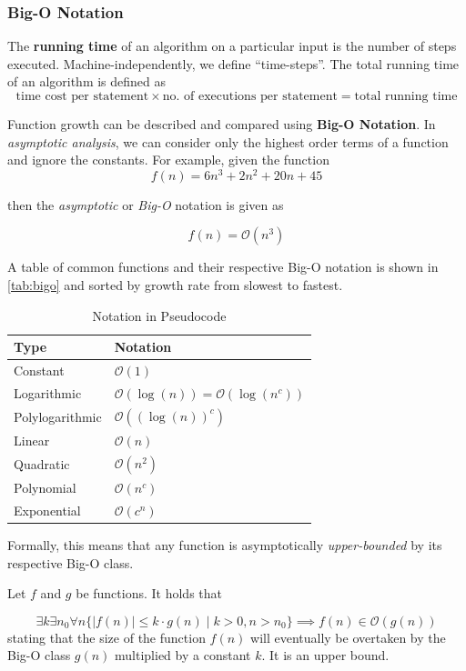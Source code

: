 \subsubsection{Big-O Notation}
The \textbf{running time} of an algorithm on a particular input is the number of steps executed. Machine-independently, we define ``time-steps''. The total running time of an algorithm is defined as
\[
	\textrm{time cost per statement} \times \textrm{no. of executions per statement} = \textrm{total running time}
\]

Function growth can be described and compared using \textbf{Big-O Notation}. In \emph{asymptotic analysis}, we can consider only the highest order terms of a function and ignore the constants. For example, given the function \[
f(n) = 6n^3 + 2n^2 + 20n +45	
\]  

then the \emph{asymptotic} or \emph{Big-O} notation is given as 

\[
	f(n) = \mathcal{O}(n^3)
		\]  
	
A table of common functions and their respective Big-O notation is shown in \autoref{tab:bigo} and sorted by growth rate from slowest to fastest.

\begin{table}[ht]
	\centering
	\begin{tabular}{ll}
	\toprule
	\textbf{Type}  & \textbf{Notation} \\ \midrule
	Constant & \( \mathcal{O}(1) \) \\
	Logarithmic &  \(\mathcal{O}(\log(n)) =\mathcal{O}(\log(n^c))\) \\
	Polylogarithmic & \(\mathcal{O}((\log(n))^c) \) \\
	Linear & \(\mathcal{O}(n) \) \\
	Quadratic & \(\mathcal{O}(n^2) \)  \\
	Polynomial & \(\mathcal{O}(n^c) \) \\
	Exponential & \(\mathcal{O}(c^n) \) \\
	\bottomrule
	\end{tabular}
	\caption{Notation in Pseudocode}\label{tab:bigo}
	\end{table}

Formally, this means that any function is asymptotically \emph{upper-bounded} by its respective Big-O class.

Let \( f \) and \( g \) be functions. It holds that

\[
	\exists k \exists n_0 \forall n \{|f(n)| \leq k \cdot g(n) \mid k > 0, n > n_0  \} \implies f(n) \in \mathcal{O}(g(n))
\]
stating that the size of the function \( f(n) \) will eventually be overtaken by the Big-O class \( g(n) \) multiplied by a constant \( k \). It is an upper bound.

